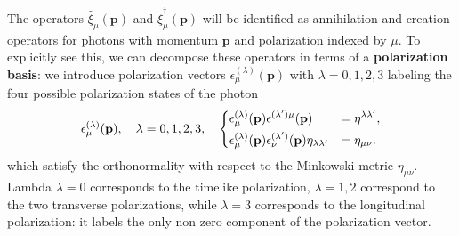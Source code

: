 The operators \(\hat{\xi}_{\mu}(\mathbf{p})\) and \(\hat{\xi}_{\mu}^{\dagger}(\mathbf{p})\) will be identified as annihilation and creation operators for photons with momentum \(\mathbf{p}\) and polarization indexed by \(\mu\). To explicitly see this, we can decompose these operators in terms of a \textbf{polarization basis}: we introduce polarization vectors \(\epsilon_{\mu}^{(\lambda)}(\mathbf{p})\) with \(\lambda = 0, 1, 2, 3\) labeling the four possible polarization states of the photon
\begin{equation}
    \epsilon_\mu^{(\lambda)}(\mathbf{p}), \quad \lambda = 0, 1, 2, 3, \quad \begin{dcases}
        \epsilon^{(\lambda)}_{\mu}(\mathbf{p}) \epsilon^{(\lambda') \mu}(\mathbf{p})                                   & = \eta^{\lambda \lambda'}, \\
        \epsilon_{\mu}^{(\lambda)}(\mathbf{p}) \epsilon_{\nu}^{(\lambda^{\prime})}(\mathbf{p}) \eta_{\lambda \lambda'} & = \eta_{\mu \nu}.
    \end{dcases}
    \label{eq:polarization_basis_and_ON_relations}
\end{equation}
which satisfy the orthonormality with respect to the Minkowski metric \(\eta_{\mu \nu}\). Lambda \(\lambda = 0\) corresponds to the timelike polarization, \(\lambda = 1, 2\) correspond to the two transverse polarizations, while \(\lambda = 3\) corresponds to the longitudinal polarization: it labels the only non zero component of the polarization vector.

